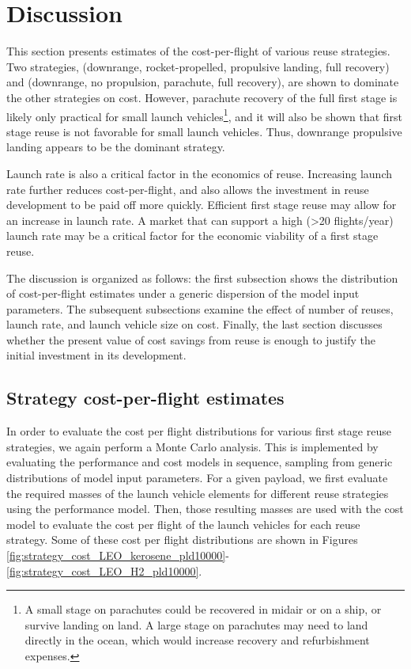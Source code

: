 \documentclass[conf]{new-aiaa}
\begin{document}
\section{Discussion}

This section presents estimates of the cost-per-flight of various reuse strategies. Two strategies, (downrange, rocket-propelled, propulsive landing, full recovery) and (downrange, no propulsion, parachute, full recovery), are shown to dominate the other strategies on cost. However, parachute recovery of the full first stage is likely only practical for small launch vehicles\footnote{A small stage on parachutes could be recovered in midair or on a ship, or survive landing on land. A large stage on parachutes may need to land directly in the ocean, which would increase recovery and refurbishment expenses.}, and it will also be shown that first stage reuse is not favorable for small launch vehicles. Thus, downrange propulsive landing appears to be the dominant strategy.

Launch rate is also a critical factor in the economics of reuse. Increasing launch rate further reduces cost-per-flight, and also allows the investment in reuse development to be paid off more quickly. Efficient first stage reuse may allow for an increase in launch rate. A market that can support a high (>20 flights/year) launch rate may be a critical factor for the economic viability of a first stage reuse.

The discussion is organized as follows: the first subsection shows the distribution of cost-per-flight estimates under a generic dispersion of the model input parameters. The subsequent subsections examine the effect of number of reuses, launch rate, and launch vehicle size on cost. Finally, the last section discusses whether the present value of cost savings from reuse is enough to justify the initial investment in its development.

\subsection{Strategy cost-per-flight estimates}

In order to evaluate the cost per flight distributions for various first stage reuse strategies, we again perform a Monte Carlo analysis. This is implemented by evaluating the performance and cost models in sequence, sampling from generic distributions of model input parameters. For a given payload, we first evaluate the required masses of the launch vehicle elements for different reuse strategies using the performance model. Then, those resulting masses are used with the cost model to evaluate the cost per flight of the launch vehicles for each reuse strategy. Some of these cost per flight distributions are shown in Figures \ref{fig:strategy_cost_LEO_kerosene_pld10000}- \ref{fig:strategy_cost_LEO_H2_pld10000}. 
\end{document}
